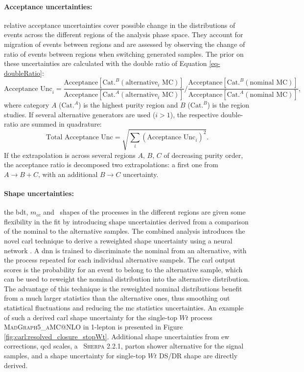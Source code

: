 \paragraph{Acceptance uncertainties:} relative acceptance uncertainties cover possible change in the distributions of events across the different regions of the analysis phase space. They account for migration of events between regions and are assessed by observing the change of ratio of events between regions when switching generated samples. The prior on these uncertainties are calculated with the double ratio of Equation \ref{eq-doubleRatio}:
\begin{equation}\label{eq-doubleRatio}
    \text{Acceptance Unc}_i = \frac{\text{Acceptance}[\text{Cat.}^B (\mathrm{alternative}_i\mathrm{\,\,MC})]}{\text{Acceptance}[\text{Cat.}^A (\mathrm{alternative}_i\mathrm{\,\,MC})]} \Bigg/ \frac{\text{Acceptance}[\text{Cat.}^B (\mathrm{nominal\,\,MC})]}{\text{Acceptance}[\text{Cat.}^A (\mathrm{nominal\,\,MC})]},
\end{equation}
where category $A$ ($\text{Cat.}^A$) is the highest purity region and $B$ ($\text{Cat.}^B$) is the region studies. If several alternative generators are used ($i > 1$), the respective double-ratio are summed in quadrature: \[ \text{Total Acceptance Unc} = \sqrt{\sum_i\left(\text{Acceptance Unc}_i\right)^2}.\] If the extrapolation is across several regions $A$, $B$, $C$ of decreasing purity order, the acceptance ratio is decomposed two extrapolations: a first one from $A \rightarrow B+C$, with an additional $B \rightarrow C$ uncertainty. 

\paragraph{Shape uncertainties:} the \gls{bdt}, $m_{cc}$ and \ptv\ shapes of the processes in the different regions are given some flexibility in the fit by introducing shape uncertainties derived from a comparison of the nominal to the alternative samples. The combined analysis introduces the novel \gls{carl} technique to derive a reweighted shape uncertainty using a neural network \cite{carl}. A \gls{dnn} is trained to discriminate the nominal from an alternative, with the process repeated for each individual alternative sampels. The \gls{carl} output scores is the probability for an event to belong to the alternative sample, which can be used to reweight the nominal distribution into the alternative distribution. The advantage of this technique is the reweighted nominal distributions benefit from a much larger statistics than the alternative ones, thus smoothing out statistical fluctuations and reducing the \gls{mc} statistics uncertainties. An example of such a derived \gls{carl} shape uncertainty for the single-top $Wt$ process \textsc{MadGraph5\_aMC@NLO} in 1-lepton is presented in Figure \ref{fig:carl:resolved_closure_stopWt}. Additional shape uncertainties from \gls{ew} corrections, \gls{qcd} scales, a \ptv\ \textsc{Sherpa} 2.2.1, parton shower alternative for the signal samples, and a shape uncertainty for single-top $Wt$ DS/DR shape are directly derived.

